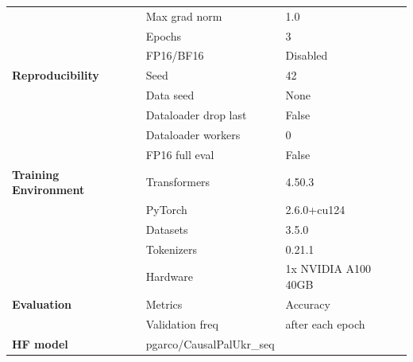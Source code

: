 \documentclass[11pt]{article}
\begin{document}
\begin{table}[htbp]
{\begin{tabular}{lll}
 & Max grad norm & 1.0 \\
 & Epochs & 3 \\
 & FP16/BF16 & Disabled \\
\midrule
\textbf{Reproducibility} & Seed & 42 \\
 & Data seed & None \\
 & Dataloader drop last & False \\
 & Dataloader workers & 0 \\
 & FP16 full eval & False \\
\midrule 
\textbf{Training Environment} & Transformers & 4.50.3 \\
 & PyTorch & 2.6.0+cu124 \\
 & Datasets & 3.5.0 \\
 & Tokenizers & 0.21.1 \\
 & Hardware & 1x NVIDIA A100 40GB\\
\midrule
\textbf{Evaluation} & Metrics & Accuracy \\
 & Validation freq & after each epoch\\
 \midrule
\textbf{HF model} & {pgarco/CausalPalUkr\_seq}\\
\bottomrule
\end{tabular}
}
\end{table}
\end{document}
